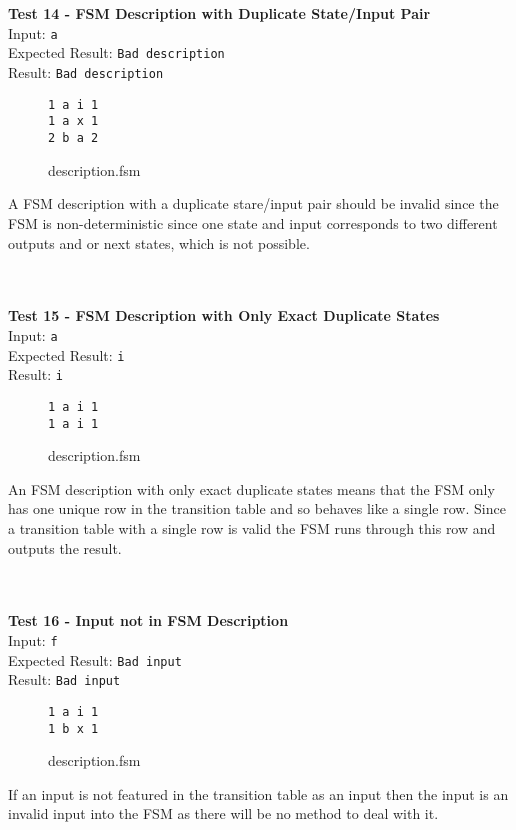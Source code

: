 \documentclass{article}
\begin{document}
\noindent \\ \\ \textbf{Test 14 - FSM Description with Duplicate State/Input Pair} \\
\noindent Input: \verb+a+ \\
Expected Result: \verb+Bad description+ \\
Result: \verb+Bad description+ \\
\begin{figure}[H]
\center
\begin{BVerbatim}
1 a i 1
1 a x 1
2 b a 2
\end{BVerbatim}
\caption{description.fsm}
\end{figure}
\noindent A FSM description with a duplicate stare/input pair should be invalid since the FSM is non-deterministic since one state and input corresponds to two different outputs and or next states, which is not possible.

\noindent \\ \\ \textbf{Test 15 - FSM Description with Only Exact Duplicate States} \\
\noindent Input: \verb+a+ \\
Expected Result: \verb+i+ \\
Result: \verb+i+ \\
\begin{figure}[H]
\center
\begin{BVerbatim}
1 a i 1
1 a i 1
\end{BVerbatim}
\caption{description.fsm}
\end{figure}
\noindent An FSM description with only exact duplicate states means that the FSM only has one unique row in the transition table and so behaves like a single row. Since a transition table with a single row is valid the FSM runs through this row and outputs the result.

\noindent \\ \\ \textbf{Test 16 - Input not in FSM Description} \\
\noindent Input: \verb+f+ \\
Expected Result: \verb+Bad input+ \\
Result: \verb+Bad input+ \\
\begin{figure}[H]
\center
\begin{BVerbatim}
1 a i 1
1 b x 1
\end{BVerbatim}
\caption{description.fsm}
\end{figure}
\noindent If an input is not featured in the transition table as an input then the input is an invalid input into the FSM as there will be no method to deal with it.
\end{document}
